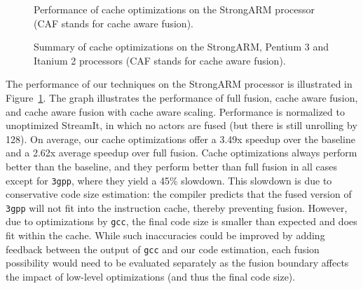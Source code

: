 \begin{figure}[t]
\centering
{}
\caption[Performance of cache optimizations on the StrongARM.]{Performance 
of cache optimizations on the StrongARM processor (CAF stands for
cache aware fusion)\protect\footnotemark[1].\protect\label{fig:arm}}
\end{figure}

\begin{figure}[t]
\centering
{}
\caption[Summary of cache optimizations on the StrongARM, Pentium 3 and 
Itanium 2.]{Summary of cache optimizations on the StrongARM, Pentium 3
and Itanium 2 processors (CAF stands for cache aware
fusion).\protect\label{fig:p3}}
\end{figure}

The performance of our techniques on the StrongARM processor is
illustrated in Figure~\ref{fig:arm}.  The graph illustrates the
performance of full fusion, cache aware fusion, and cache aware fusion
with cache aware scaling.  Performance is normalized to unoptimized
StreamIt, in which no actors are fused (but there is still unrolling
by 128).  On average, our cache optimizations offer a 3.49x speedup
over the baseline and a 2.62x average speedup over full fusion.  Cache
optimizations always perform better than the baseline, and they
perform better than full fusion in all cases except for \texttt{3gpp},
where they yield a 45\% slowdown.  This slowdown is due to
conservative code size estimation: the compiler predicts that the
fused version of \texttt{3gpp} will not fit into the instruction
cache, thereby preventing fusion.  However, due to optimizations by
{\tt gcc}, the final code size is smaller than expected and does fit
within the cache.  While such inaccuracies could be improved by adding
feedback between the output of {\tt gcc} and our code estimation, each
fusion possibility would need to be evaluated separately as the fusion
boundary affects the impact of low-level optimizations (and thus the
final code size).


